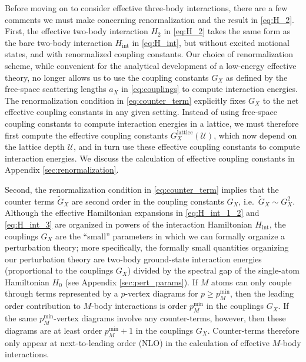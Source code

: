 \documentclass[preprint,showkeys,nofootinbib]{revtex4-1}
\renewcommand{\t}{\text} %
\newcommand{\p}[1]{\left(#1\right)} %
\newcommand{\U}{\mathcal{U}}
\newcommand{\1}{\mathds{1}}
\begin{document}
Before moving on to consider effective three-body interactions, there
are a few comments we must make concerning renormalization and the
result in \eqref{eq:H_2}.  First, the effective two-body interaction
$H_2$ in \eqref{eq:H_2} takes the same form as the bare two-body
interaction $H_{\t{int}}$ in \eqref{eq:H_int}, but without excited
motional states, and with renormalized coupling constants.  Our choice
of renormalization scheme, while convenient for the analytical
development of a low-energy effective theory, no longer allows us to
use the coupling constants $G_X$ as defined by the free-space
scattering lengths $a_X$ in \eqref{eq:couplings} to compute
interaction energies.  The renormalization condition in
\eqref{eq:counter_term} explicitly fixes $G_X$ to the net effective
coupling constants in any given setting.  Instead of using free-space
coupling constants to compute interaction energies in a lattice, we
must therefore first compute the effective coupling constants
$G_X^{\t{lattice}}\p{\U}$, which now depend on the lattice depth $\U$,
and in turn use these effective coupling constants to compute
interaction energies.  We discuss the calculation of effective
coupling constants in Appendix \ref{sec:renormalization}.

Second, the renormalization condition in \eqref{eq:counter_term}
implies that the counter terms $\widetilde G_X$ are second order in
the coupling constants $G_X$, i.e.~$\widetilde G_X\sim G_X^2$.
Although the effective Hamiltonian expansions in \eqref{eq:H_int_1_2}
and \eqref{eq:H_int_3} are organized in powers of the interaction
Hamiltonian $H_{\t{int}}$, the couplings $G_X$ are the ``small''
parameters in which we can formally organize a perturbation theory;
more specifically, the formally small quantities organizing our
perturbation theory are two-body ground-state interaction energies
(proportional to the couplings $G_X$) divided by the spectral gap of
the single-atom Hamiltonian $H_0$ (see Appendix
\ref{sec:pert_params}).  If $M$ atoms can only couple through terms
represented by a $p$-vertex diagrams for $p\ge p_M^{\t{min}}$, then
the leading order contribution to $M$-body interactions is order
$p_M^{\t{min}}$ in the couplings $G_X$.  If the same
$p_M^{\t{min}}$-vertex diagrams involve any counter-terms, however,
then these diagrams are at least order $p_M^{\t{min}}+1$ in the
couplings $G_X$.  Counter-terms therefore only appear at
next-to-leading order (NLO) in the calculation of effective $M$-body
interactions.
\end{document}
